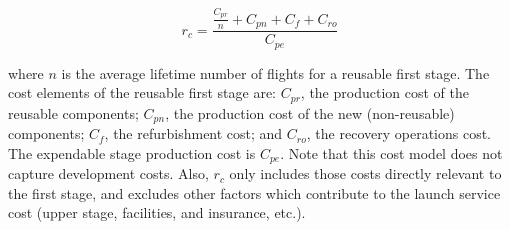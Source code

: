 \documentclass[conf]{new-aiaa}
\begin{document}
\begin{equation}
\label{eq:cost_elements}
r_c = \frac{\frac{C_{pr}}{n} + C_{pn} + C_f + C_{ro}}{C_{pe}}
\end{equation}

where $n$ is the average lifetime number of flights for a reusable first stage. The cost elements of the reusable first stage are: $C_{pr}$, the production cost of the reusable components; $C_{pn}$, the production cost of the new (non-reusable) components; $C_f$, the refurbishment cost; and $C_{ro}$, the recovery operations cost. The expendable stage production cost is $C_{pe}$. Note that this cost model does not capture development costs. Also, $r_c$ only includes those costs directly relevant to the first stage, and excludes other factors which contribute to the launch service cost (upper stage, facilities, and insurance, etc.).
\end{document}
